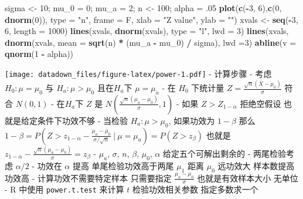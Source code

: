 \documentclass[
]{book}
\newenvironment{Shaded}{\begin{snugshade}}{\end{snugshade}}
\newcommand{\DataTypeTok}[1]{\textcolor[rgb]{0.13,0.29,0.53}{#1}}
\newcommand{\DecValTok}[1]{\textcolor[rgb]{0.00,0.00,0.81}{#1}}
\newcommand{\FloatTok}[1]{\textcolor[rgb]{0.00,0.00,0.81}{#1}}
\newcommand{\KeywordTok}[1]{\textcolor[rgb]{0.13,0.29,0.53}{\textbf{#1}}}
\newcommand{\NormalTok}[1]{#1}
\newcommand{\OperatorTok}[1]{\textcolor[rgb]{0.81,0.36,0.00}{\textbf{#1}}}
\newcommand{\StringTok}[1]{\textcolor[rgb]{0.31,0.60,0.02}{#1}}
\begin{document}
\begin{Shaded}
\begin{Highlighting}[]
\NormalTok{sigma <-}\StringTok{ }\DecValTok{10}\NormalTok{; mu_}\DecValTok{0}\NormalTok{ =}\StringTok{ }\DecValTok{0}\NormalTok{; mu_a =}\StringTok{ }\DecValTok{2}\NormalTok{; n <-}\StringTok{ }\DecValTok{100}\NormalTok{; alpha =}\StringTok{ }\FloatTok{.05}
\KeywordTok{plot}\NormalTok{(}\KeywordTok{c}\NormalTok{(}\OperatorTok{-}\DecValTok{3}\NormalTok{, }\DecValTok{6}\NormalTok{),}\KeywordTok{c}\NormalTok{(}\DecValTok{0}\NormalTok{, }\KeywordTok{dnorm}\NormalTok{(}\DecValTok{0}\NormalTok{)), }\DataTypeTok{type =} \StringTok{"n"}\NormalTok{, }\DataTypeTok{frame =}\NormalTok{ F, }\DataTypeTok{xlab =} \StringTok{"Z value"}\NormalTok{, }\DataTypeTok{ylab =} \StringTok{""}\NormalTok{)}
\NormalTok{xvals <-}\StringTok{ }\KeywordTok{seq}\NormalTok{(}\OperatorTok{-}\DecValTok{3}\NormalTok{, }\DecValTok{6}\NormalTok{, }\DataTypeTok{length =} \DecValTok{1000}\NormalTok{)}
\KeywordTok{lines}\NormalTok{(xvals, }\KeywordTok{dnorm}\NormalTok{(xvals), }\DataTypeTok{type =} \StringTok{"l"}\NormalTok{, }\DataTypeTok{lwd =} \DecValTok{3}\NormalTok{)}
\KeywordTok{lines}\NormalTok{(xvals, }\KeywordTok{dnorm}\NormalTok{(xvals, }\DataTypeTok{mean =} \KeywordTok{sqrt}\NormalTok{(n) }\OperatorTok{*}\StringTok{ }\NormalTok{(mu_a }\OperatorTok{-}\StringTok{ }\NormalTok{mu_}\DecValTok{0}\NormalTok{) }\OperatorTok{/}\StringTok{ }\NormalTok{sigma), }\DataTypeTok{lwd =}\DecValTok{3}\NormalTok{)}
\KeywordTok{abline}\NormalTok{(}\DataTypeTok{v =} \KeywordTok{qnorm}\NormalTok{(}\DecValTok{1} \OperatorTok{-}\StringTok{ }\NormalTok{alpha))}
\end{Highlighting}
\end{Shaded}

\texttt{[image: datadown\_files/figure-latex/power-1.pdf]}
- 计算步骤
- 考虑 \(H_0 : \mu = \mu_0\) 与 \(H_a : \mu > \mu_0\) 且在\(H_a\)下 \(\mu = \mu_a\)
- 在 \(H_0\) 下统计量 \(Z = \frac{\sqrt{n}(\bar X - \mu_0)}{\sigma}\) 符合 \(N(0, 1)\)
- 在\(H_a\)下 \(Z\) 是 \(N\left( \frac{\sqrt{n}(\mu_a - \mu_0)}{\sigma}, 1\right)\)
- 如果 \(Z > Z_{1-\alpha}\) 拒绝空假设 也就是给定条件下功效不够
- 当检验 \(H_a : \mu > \mu_0\), 如果功效为 \(1 - \beta\) 那么
\(1 - \beta = P\left(Z > z_{1-\alpha} - \frac{\mu_a - \mu_0}{\sigma /\sqrt{n}} ~|~ \mu = \mu_a \right) = P(Z > z_{\beta})\) 也就是 \(z_{1-\alpha} - \frac{\sqrt{n}(\mu_a - \mu_0)}{\sigma} = z_{\beta}\)
- \(\mu_a\), \(\sigma\), \(n\), \(\beta\), \(\mu_0\), \(\alpha\) 给定五个可解出剩余的
- 两尾检验考虑 \(\alpha / 2\)
- 功效在 \(\alpha\) 提高 单尾检验功效高于两尾 \(\mu_1\) 距离 \(\mu_0\) 远功效大 样本数提高功效高
- 计算功效不需要特定样本 只需要指定 \(\frac{\mu_a - \mu_0}{\sigma}\) 也就是有效样本大小 无单位
- R 中使用 \texttt{power.t.test} 来计算 \(t\) 检验功效相关参数 指定多数求一个
\end{document}
